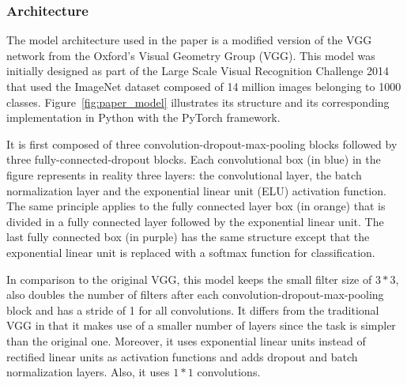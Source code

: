 \subsubsection{Architecture}
\setlength{\marginparwidth}{3cm}\leavevmode {}The model architecture used in the paper is a modified version of the VGG network from the Oxford's Visual Geometry Group (VGG). This model was initially designed as part of the Large Scale Visual Recognition Challenge 2014 that used the ImageNet dataset composed of 14 million images belonging to 1000 classes. \mbox{Figure \ref{fig:paper_model}} illustrates its structure and its corresponding implementation in Python with the PyTorch framework.

It is first composed of three convolution-dropout-max-pooling blocks followed by three fully-connected-dropout blocks. Each convolutional box (in blue) in the figure represents in reality three layers: the convolutional layer, the batch normalization layer and the exponential linear unit (ELU) activation function. The same principle applies to the fully connected layer box (in orange) that is divided in a fully connected layer followed by the exponential linear unit. The last fully connected box (in purple) has the same structure except that the exponential linear unit is replaced with a softmax function for classification.

In comparison to the original VGG, this model keeps the small filter size of $3*3$, also doubles the number of filters after each convolution-dropout-max-pooling block and has a stride of 1 for all convolutions. It differs from the traditional VGG in that it makes use of a smaller number of layers since the task is simpler than the original one. Moreover, it uses exponential linear units instead of rectified linear units as activation functions and adds dropout and batch normalization layers. Also, it uses $1*1$ convolutions. 

